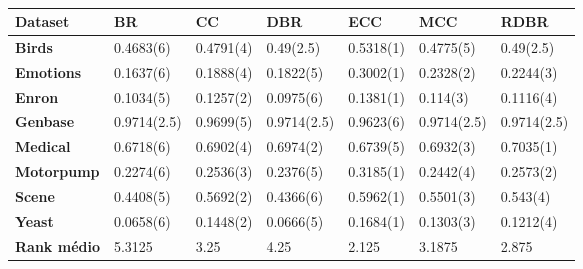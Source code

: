 \begin{table}[\tabmode]
\begin{tabular}{lllllll}
\hline
\textbf{Dataset}    & \textbf{BR} & \textbf{CC} & \textbf{DBR} & \textbf{ECC} & \textbf{MCC} & \textbf{RDBR} \\ \hline
\textbf{Birds}      & 0.4683(6)   & 0.4791(4)   & 0.49(2.5)    & 0.5318(1)    & 0.4775(5)    & 0.49(2.5)     \\
\textbf{Emotions}   & 0.1637(6)   & 0.1888(4)   & 0.1822(5)    & 0.3002(1)    & 0.2328(2)    & 0.2244(3)     \\
\textbf{Enron}      & 0.1034(5)   & 0.1257(2)   & 0.0975(6)    & 0.1381(1)    & 0.114(3)     & 0.1116(4)     \\
\textbf{Genbase}    & 0.9714(2.5) & 0.9699(5)   & 0.9714(2.5)  & 0.9623(6)    & 0.9714(2.5)  & 0.9714(2.5)   \\
\textbf{Medical}    & 0.6718(6)   & 0.6902(4)   & 0.6974(2)    & 0.6739(5)    & 0.6932(3)    & 0.7035(1)     \\
\textbf{Motorpump}  & 0.2274(6)   & 0.2536(3)   & 0.2376(5)    & 0.3185(1)    & 0.2442(4)    & 0.2573(2)     \\
\textbf{Scene}      & 0.4408(5)   & 0.5692(2)   & 0.4366(6)    & 0.5962(1)    & 0.5501(3)    & 0.543(4)      \\
\textbf{Yeast}      & 0.0658(6)   & 0.1448(2)   & 0.0666(5)    & 0.1684(1)    & 0.1303(3)    & 0.1212(4)     \\ \hline
\textbf{Rank médio} & 5.3125      & 3.25        & 4.25         & 2.125        & 3.1875       & 2.875         \\ \hline
\end{tabular}
\caption{}
\label{tab:SAj48}
\end{table}
